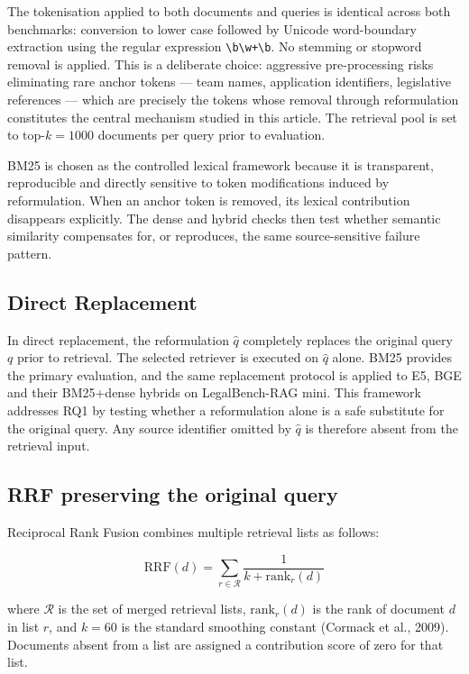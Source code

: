 \documentclass[a4paper,fleqn]{cas-dc}
\begin{document}
The tokenisation applied to both documents and queries 
is identical across both benchmarks: conversion to lower case followed 
by Unicode word-boundary extraction using the 
regular expression \texttt{\textbackslash b\textbackslash w+\textbackslash b}. 
No stemming or stopword removal is applied. 
This is a deliberate choice: aggressive pre-processing risks 
eliminating rare anchor tokens — team names, 
application identifiers, legislative references — which are 
precisely the tokens whose removal through reformulation 
constitutes the central mechanism studied in this article. The 
retrieval pool is set to $\text{top-}k = 1000$ documents per 
query prior to evaluation.

BM25 is chosen as the controlled lexical framework because it is transparent,
reproducible and directly sensitive to token modifications induced
by reformulation. When an anchor token is removed, its lexical
contribution disappears explicitly. The dense and hybrid checks
then test whether semantic similarity compensates for, or reproduces,
the same source-sensitive failure pattern.


\subsection{Direct Replacement}

In direct replacement, the reformulation $\hat{q}$ completely replaces 
the original query $q$ prior to retrieval. The selected retriever
is executed on $\hat{q}$ alone. BM25 provides the primary
evaluation, and the same replacement protocol is applied to E5,
BGE and their BM25+dense hybrids on LegalBench-RAG mini. This
framework addresses RQ1 by testing whether a reformulation alone
is a safe substitute for the original query. Any source identifier
omitted by $\hat{q}$ is therefore absent from the retrieval input.

\subsection{RRF preserving the original query}

Reciprocal Rank Fusion combines multiple retrieval lists 
as follows:

\begin{equation}
    \text{RRF}(d) = \sum_{r \in \mathcal{R}}
    \frac{1}{k + \text{rank}_r(d)}
    \label{eq:rrf}
\end{equation}

where $\mathcal{R}$ is the set of merged retrieval lists, 
$\text{rank}_r(d)$ is the rank of document $d$ in list $r$, and 
$k = 60$ is the standard smoothing constant (Cormack et al., 2009). 
Documents absent from a list are assigned a contribution score of 
zero for that list.
\end{document}
